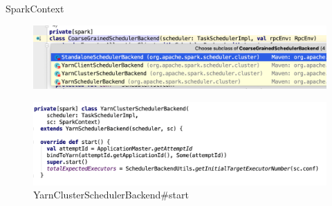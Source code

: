 \begin{frame}[plain,t]{SparkContext} %
	 \\  
	\begin{figure}
		\centering
		\includegraphics[width=0.9\linewidth]{images/init011}
		\label{fig:init011}
	\end{figure}

\begin{figure}
	\centering
	\includegraphics[width=0.9\linewidth]{images/init013}
	\caption{YarnClusterSchedulerBackend\#start}
	\label{fig:init013}
\end{figure}
\end{frame}

